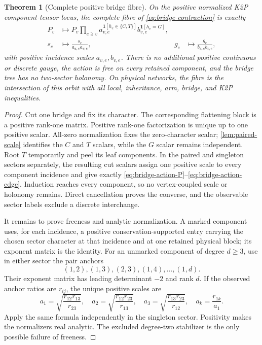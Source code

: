 \documentclass[11pt]{article}
\newtheorem{theorem}{Theorem}[section]
\theoremstyle{remark}
\newcommand{\1}{\mathbf 1}
\begin{document}
\begin{theorem}[Complete positive bridge fibre]\label{thm:bridge-fibre}
On the positive normalized K2P component-tensor locus, the complete fibre of
\eqref{eq:bridge-contraction} is exactly
\begin{align}
 P_v&\longmapsto P_v
 \prod_{e\ni v}
 a_{v,e}^{\1[h_e\in\{C,T\}]}
 b_{v,e}^{\1[h_e=G]},\label{eq:bridge-action-P}\\
 s_e&\longmapsto\frac{s_e}{a_{u,e}a_{v,e}},
 &g_e&\longmapsto\frac{g_e}{b_{u,e}b_{v,e}},
 \label{eq:bridge-action-edge}
\end{align}
with positive incidence scales \(a_{v,e},b_{v,e}\).  There is no additional
positive continuous or discrete gauge, the action is free on every retained
component, and the bridge tree has no two-sector holonomy.  On physical
networks, the fibre is the intersection of this orbit with all local,
inheritance, arm, bridge, and K2P inequalities.
\end{theorem}

\begin{proof}
Cut one bridge and fix its character.  The corresponding flattening block is
a positive rank-one matrix.  Positive rank-one factorization is unique up to
one positive scalar.  All-zero normalization fixes the zero-character scalar;
\cref{lem:paired-scale} identifies the \(C\) and \(T\) scalars, while the
\(G\) scalar remains independent.  Root \(T\) temporarily and peel its leaf
components.  In the paired and singleton sectors separately, the resulting
cut scalars assign one positive scale to every component incidence and give
exactly \eqref{eq:bridge-action-P}--\eqref{eq:bridge-action-edge}.  Induction
reaches every component, so no vertex-coupled scale or holonomy remains.
Direct cancellation proves the converse, and the observable sector labels
exclude a discrete interchange.

It remains to prove freeness and analytic normalization.  A marked component
uses, for each incidence, a positive conservation-supported entry carrying
the chosen sector character at that incidence and at one retained physical
block; its exponent matrix is the identity.  For an unmarked component of
degree \(d\ge3\), use in either sector the pair anchors
\[
 (1,2),(1,3),(2,3),(1,4),\ldots,(1,d).
\]
Their exponent matrix has leading determinant \(-2\) and rank \(d\).  If the
observed anchor ratios are \(r_{ij}\), the unique positive scales are
\begin{equation}\label{eq:bridge-normalizer}
 a_1=\sqrt{\frac{r_{12}r_{13}}{r_{23}}},\quad
 a_2=\sqrt{\frac{r_{12}r_{23}}{r_{13}}},\quad
 a_3=\sqrt{\frac{r_{13}r_{23}}{r_{12}}},\quad
 a_k=\frac{r_{1k}}{a_1}.
\end{equation}
Apply the same formula independently in the singleton sector.  Positivity
makes the normalizers real analytic.  The excluded degree-two stabilizer is
the only possible failure of freeness.
\end{proof}
\end{document}
